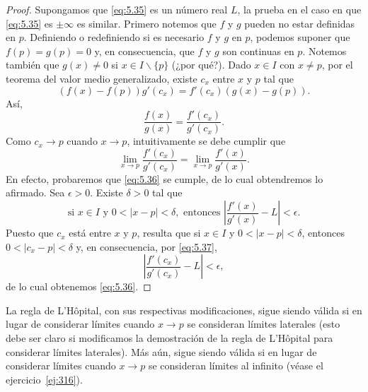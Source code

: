 \documentclass[12pt,a4paper]{book}
\begin{document}
    \begin{proof}
        Supongamos que \eqref{eq:5.35} es un número real $L$, la prueba en
        el caso en que \eqref{eq:5.35} es $\pm\infty$ es similar. Primero notemos que $f$ y $g$ pueden
        no estar definidas en $p$. Definiendo o redefiniendo si es necesario $f$ y $g$ en $p$,
        podemos suponer que $f(p)=g(p)=0$ y, en consecuencia, que $f$ y $g$ son
        continuas en $p$. Notemos también que $g(x)\neq 0$ si $x\in I\backslash\{p\}$ (¿por qué?).
        Dado $x\in I$ con $x\neq p$, por el teorema del valor medio generalizado, existe $c_{x}$
        entre $x$ y $p$ tal que
        \begin{equation*}
            (f(x)-f(p))g'(c_{x})=f'(c_{x})(g(x)-g(p)).
        \end{equation*}
        Así,
        \begin{equation*}
            \frac{f(x)}{g(x)}=\frac{f'(c_{x})}{g'(c_{x})}.
        \end{equation*}
        Como $c_{x}\to p$ cuando $x\to p$, intuitivamente se debe cumplir que
        \begin{equation}\label{eq:5.36}
            \lim_{x\to p}\frac{f'(c_{x})}{g'(c_{x})}=\lim_{x\to p}\frac{f'(x)}{g'(x)}.
        \end{equation}
        En efecto, probaremos que \eqref{eq:5.36} se cumple, de lo cual obtendremos lo afirmado.
        Sea $\epsilon>0$. Existe $\delta>0$ tal que
        \begin{equation}\label{eq:5.37}
            \text{si }x\in I\text{ y }0<|x-p|<\delta,\text{ entonces }\left|\frac{f'(x)}{g'(x)}-L\right|<\epsilon.
        \end{equation}
        Puesto que $c_{x}$ está entre $x$ y $p$, resulta que si $x\in I$ y $0<|x-p|<\delta$, entonces
        $0<|c_{x}-p|<\delta$ y, en consecuencia, por \eqref{eq:5.37},
        \begin{equation*}
            \left|\frac{f'(c_{x})}{g'(c_{x})}-L\right|<\epsilon,
        \end{equation*}
        de lo cual obtenemos \eqref{eq:5.36}.
    \end{proof}

    La regla de L'Hôpital, con sus respectivas modificaciones, sigue siendo
    válida si en lugar de considerar límites cuando $x\to p$ se consideran límites
    laterales (esto debe ser claro si modificamos la demostración de la regla de
    L'Hôpital para considerar límites laterales). Más aún, sigue siendo válida si
    en lugar de considerar límites cuando $x\to p$ se consideran límites al infinito
    (véase el ejercicio~\ref{ej:316}).
\end{document}
